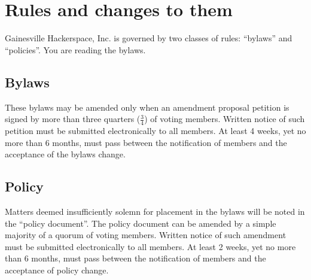 \documentclass[10pt,letterpaper,titlepage]{article}
\newcommand\corpname{Gainesville Hackerspace, Inc.}
\begin{document}
\section{Rules and changes to them}
\label{rules}

\corpname{} is governed by two classes of rules: ``bylaws'' and
``policies''.  You are reading the bylaws.

\subsection{Bylaws}

These bylaws may be amended only when an amendment proposal petition
is signed by more than three quarters ($\frac{3}{4}$) of voting
members.  Written notice of such petition must be submitted
electronically to all members.  At least 4 weeks, yet no more than 6
months, must pass between the notification of members and the
acceptance of the bylaws change.

\subsection{Policy}

Matters deemed insufficiently solemn for placement in the bylaws will
be noted in the ``policy document''.  The policy document can be
amended by a simple majority of a quorum of voting members.  Written
notice of such amendment must be submitted electronically to all
members.  At least 2 weeks, yet no more than 6 months, must pass
between the notification of members and the acceptance of policy
change.
\end{document}
